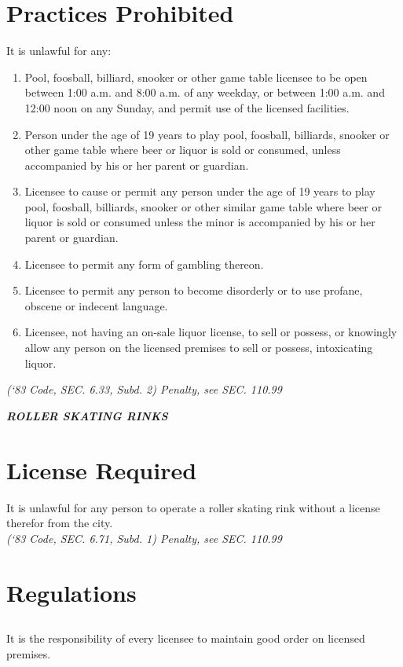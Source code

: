 \section{Practices Prohibited}
It is unlawful for any:
\begin{enumerate}[{\indent}A)]
    \item Pool, foosball, billiard, snooker or other game table licensee to be open between 1:00 a.m. and 8:00 a.m. of any weekday, or between 1:00 a.m. and 12:00 noon on any Sunday, and permit use of the licensed facilities.
    \item Person under the age of 19 years to play pool, foosball, billiards, snooker or other game table where beer or liquor is sold or consumed, unless accompanied by his or her parent or guardian.
    \item Licensee to cause or permit any person under the age of 19 years to play pool, foosball, billiards, snooker or other similar game table where beer or liquor is sold or consumed unless the minor is accompanied by his or her parent or guardian.
    \item Licensee to permit any form of gambling thereon.
    \item Licensee to permit any person to become disorderly or to use profane, obscene or indecent language.
    \item Licensee, not having an on-sale liquor license, to sell or possess, or knowingly allow any person on the licensed premises to sell or possess, intoxicating liquor.
\end{enumerate}
\emph{(‘83 Code, SEC. 6.33, Subd. 2)  Penalty, see SEC. 110.99}

\begin{center}
    \emph{\textbf{\LARGE{ROLLER SKATING RINKS}}}
\end{center}

\setcounter{section}{59}
\section{License Required}
It is unlawful for any person to operate a roller skating rink without a license therefor from the city.\\
\emph{(‘83 Code, SEC. 6.71, Subd. 1)  Penalty, see SEC. 110.99}
\section{Regulations}
\subsection{}
It is the responsibility of every licensee to maintain good order on licensed premises.
